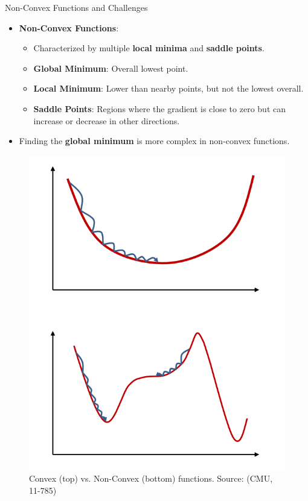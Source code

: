\documentclass[serif, aspectratio=169]{beamer}
\begin{document}
\begin{frame}{Non-Convex Functions and Challenges}
\begin{minipage}{0.65\linewidth}
    \begin{itemize}
        \item \textbf{Non-Convex Functions}:
        \begin{itemize}
            \item Characterized by multiple \textbf{local minima} and \textbf{saddle points}.
            \item \textbf{Global Minimum}: Overall lowest point.
            \item \textbf{Local Minimum}: Lower than nearby points, but not the lowest overall.
            \item \textbf{Saddle Points}: Regions where the gradient is close to zero but can increase or decrease in other directions.
        \end{itemize}
        \item Finding the \textbf{global minimum} is more complex in non-convex functions.
    \end{itemize}
\end{minipage}%
\begin{minipage}{0.25\linewidth}
    \begin{figure}[h]
        \centering
        \includegraphics[height=0.65\textheight]{pic/convex_nonconvex.png}
        \caption{\footnotesize Convex (top) vs. Non-Convex (bottom) functions. Source: (CMU, 11-785)}
    \end{figure}
\end{minipage}
\end{frame}
\end{document}
